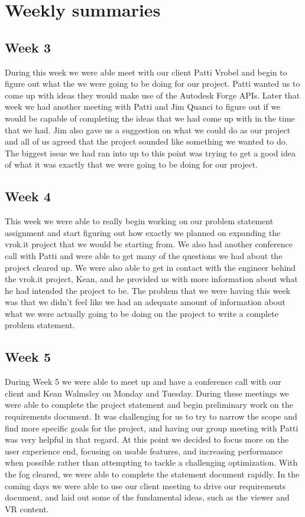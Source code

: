 \documentclass[10pt,draftclsnofoot,onecolumn]{IEEEtran}
\begin{document}
\section{Weekly summaries}
\subsection{Week 3}
During this week we were able meet with our client Patti Vrobel and begin to figure out what the we were going to be doing for our project. Patti wanted us to come up with ideas they would make use of the Autodesk Forge APIs. Later that week we had another meeting with Patti and Jim Quanci to figure out if we would be capable of completing the ideas that we had come up with in the time that we had. Jim also gave us a suggestion on what we could do as our project and all of us agreed that the project sounded like something we wanted to do. The biggest issue we had ran into up to this point was trying to get a good idea of what it was exactly that we were going to be doing for our project.   

\subsection{Week 4}
This week we were able to really begin working on our problem statement assignment and start figuring out how exactly we planned on expanding the vrok.it project that we would be starting from. We also had another conference call with Patti and were able to get many of the questions we had about the project cleared up. We were also able to get in contact with the engineer behind the vrok.it project, Kean, and he provided us with more information about what he had intended the project to be. The problem that we were having this week was that we didn't feel like we had an adequate amount of information about what we were actually going to be doing on the project to write a complete problem statement. 

\subsection{Week 5}
During Week 5 we were able to meet up and have a conference call with our client and Kean Walmsley on Monday and Tuesday. During these meetings we were able to complete the project statement and begin preliminary work on the requirements document. It was challenging for us to try to narrow the scope and find more specific goals for the project, and having our group meeting with Patti was very helpful in that regard. At this point we decided to focus more on the user experience end, focusing on usable features, and increasing performance when possible rather than attempting to tackle a challenging optimization. With the fog cleared, we were able to complete the statement document rapidly. In the coming days we were able to use our client meeting to drive our requirements document, and laid out some of the fundamental ideas, such as the viewer and VR content.
\end{document}
